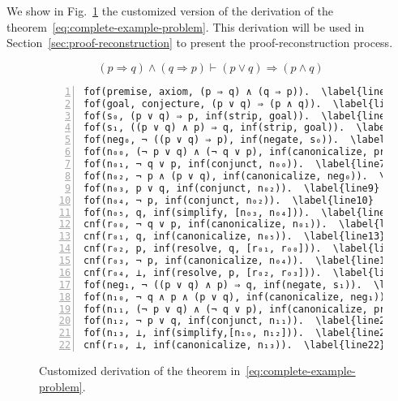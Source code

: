 \documentclass[../main.tex]{subfiles}
\begin{document}
\begin{myexamplenum}
\label{fig:metis-example-tree}
We show in Fig.~\ref{complete-metis-example} the customized version
of the \Metis derivation of the theorem~\eqref{eq:complete-example-problem}.
This derivation will be used in Section~\ref{sec:proof-reconstruction} to
present the proof-reconstruction process.

\begin{equation}
\label{eq:complete-example-problem}
(p \Rightarrow q) \wedge (q \Rightarrow p) ⊢ (p \vee q) \Rightarrow (p \wedge q)
\end{equation}

\begin{figure}
\begin{Verbatim}[commandchars=\\\{\}, numbers=left,xleftmargin=5mm]
fof(premise, axiom, (p ⇒ q) ∧ (q ⇒ p)).  \label{line1}
fof(goal, conjecture, (p ∨ q) ⇒ (p ∧ q)).  \label{line2}
fof(s₀, (p ∨ q) ⇒ p, inf(strip, goal)).  \label{line3}
fof(s₁, ((p ∨ q) ∧ p) ⇒ q, inf(strip, goal)).  \label{line4}
fof(neg₀, ¬ ((p ∨ q) ⇒ p), inf(negate, s₀)).  \label{line5}
fof(n₀₀, (¬ p ∨ q) ∧ (¬ q ∨ p), inf(canonicalize, premise)).  \label{line6}
fof(n₀₁, ¬ q ∨ p, inf(conjunct, n₀₀)).  \label{line7}
fof(n₀₂, ¬ p ∧ (p ∨ q), inf(canonicalize, neg₀)).  \label{line8}
fof(n₀₃, p ∨ q, inf(conjunct, n₀₂)).  \label{line9}
fof(n₀₄, ¬ p, inf(conjunct, n₀₂)).  \label{line10}
fof(n₀₅, q, inf(simplify, [n₀₃, n₀₄])).  \label{line11}
cnf(r₀₀, ¬ q ∨ p, inf(canonicalize, n₀₁)).  \label{line12}
cnf(r₀₁, q, inf(canonicalize, n₀₅)).  \label{line13}
cnf(r₀₂, p, inf(resolve, q, [r₀₁, r₀₀])).  \label{line14}
cnf(r₀₃, ¬ p, inf(canonicalize, n₀₄)).  \label{line15}
cnf(r₀₄, ⊥, inf(resolve, p, [r₀₂, r₀₃])).  \label{line16}
fof(neg₁, ¬ ((p ∨ q) ∧ p) ⇒ q, inf(negate, s₁)).  \label{line17}
fof(n₁₀, ¬ q ∧ p ∧ (p ∨ q), inf(canonicalize, neg₁)).  \label{line18}
fof(n₁₁, (¬ p ∨ q) ∧ (¬ q ∨ p), inf(canonicalize, premise)).  \label{line19}
fof(n₁₂, ¬ p ∨ q, inf(conjunct, n₁₁)).  \label{line20}
fof(n₁₃, ⊥, inf(simplify,[n₁₀, n₁₂])).  \label{line21}
cnf(r₁₀, ⊥, inf(canonicalize, n₁₃)).  \label{line22}
\end{Verbatim}
\caption{Customized \Metis \TSTP derivation of the theorem in~\eqref{eq:complete-example-problem}.}
\label{complete-metis-example}
\end{figure}

\end{myexamplenum}


\end{document}
